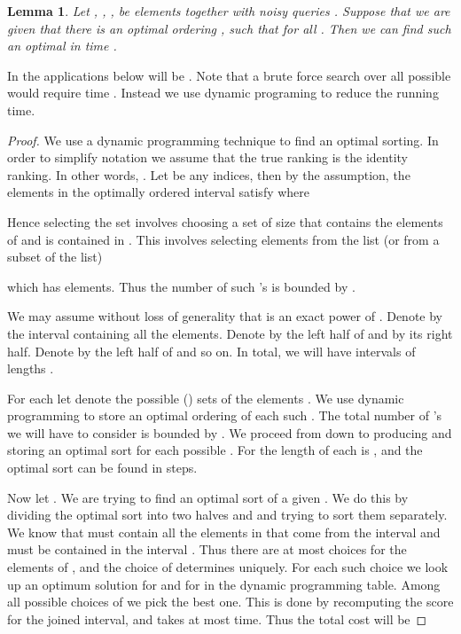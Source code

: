 \documentclass[11pt]{article}
\newtheorem{lemma}[theorem]{Lemma}
\begin{document}
\begin{lemma}
\label{lem:presort}
Let , , ,   be  elements 
together with noisy queries . Suppose that 
we are given that there is an optimal ordering 
, such
that  for all .  
Then we can find such an optimal  in time . 
\end{lemma}
In the applications below  will be .  
Note that a brute force search over all possible  would require time 
. Instead we use dynamic programing to reduce the running time. 

\begin{proof}

We use a dynamic programming technique to find an optimal sorting. 
In order to simplify notation we assume that the true ranking  is the 
identity ranking. In other words, . 
Let  be any 
indices, then by the assumption, the elements in the optimally ordered interval 
 satisfy 
 where

Hence selecting the set  involves 
choosing a set of size  that contains the elements of  and is contained in
. This involves selecting  elements from the list (or from a subset of the list)

which has  elements. Thus the number of such 's is bounded by . 

We may assume without loss of generality that  is an exact power of .  
Denote by 
 the interval containing all the elements. Denote by  the left
half of  and by  its right half. Denote by  the left half
of  and so on. In total, we will have  intervals of lengths . 

For each  let  denote the possible () sets of 
the elements . We use dynamic programming to store an
optimal ordering of each such . The total number of 's we will 
have to consider is bounded by . We proceed from  down
to  producing and storing an optimal sort for each possible . For 
 the length of each  is , and the optimal sort 
can be found in  steps. 

Now let . We are trying to find an optimal sort of a given . We do 
this by dividing the optimal sort into two halves  and  and trying to 
sort them separately. We know that  must contain all the elements in
 that come from the interval  and must be contained
in the interval . Thus there are at most  choices for 
the elements of , and the choice of  determines  uniquely. For 
each such choice we look up an optimum solution for  and for  in the
dynamic programming table. 
Among all possible choices of  we pick the best one. This is done 
by recomputing the score  for the joined interval, 
and takes at most  time. Thus the total 
cost will be 

\end{proof}
\end{document}
